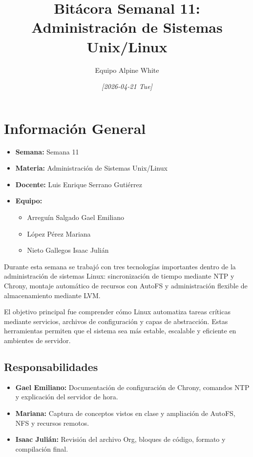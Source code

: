 \documentclass[11pt, letterpaper]{article}
\author{Equipo Alpine White}
\date{\textit{{[}2026-04-21 Tue]}}
\title{Bitácora Semanal 11: Administración de Sistemas Unix/Linux}
\begin{document}
\maketitle
\setcounter{tocdepth}{2}
\tableofcontents

\section{Información General}
\label{sec:orga75b20f}

\begin{itemize}
\item \textbf{Semana:} Semana 11
\item \textbf{Materia:} Administración de Sistemas Unix/Linux
\item \textbf{Docente:} Luis Enrique Serrano Gutiérrez
\item \textbf{Equipo:}
\begin{itemize}
\item Arreguín Salgado Gael Emiliano
\item López Pérez Mariana
\item Nieto Gallegos Isaac Julián
\end{itemize}
\end{itemize}

Durante esta semana se trabajó con tres tecnologías importantes dentro de la administración de sistemas Linux: sincronización de tiempo mediante NTP y Chrony, montaje automático de recursos con AutoFS y administración flexible de almacenamiento mediante LVM.

El objetivo principal fue comprender cómo Linux automatiza tareas críticas mediante servicios, archivos de configuración y capas de abstracción. Estas herramientas permiten que el sistema sea más estable, escalable y eficiente en ambientes de servidor.
\subsection{Responsabilidades}
\label{sec:orgaa071f7}
\begin{itemize}
\item \textbf{Gael Emiliano:} Documentación de configuración de Chrony, comandos NTP y explicación del servidor de hora.
\item \textbf{Mariana:} Captura de conceptos vistos en clase y ampliación de AutoFS, NFS y recursos remotos.
\item \textbf{Isaac Julián:} Revisión del archivo Org, bloques de código, formato y compilación final.
\end{itemize}
\end{document}
